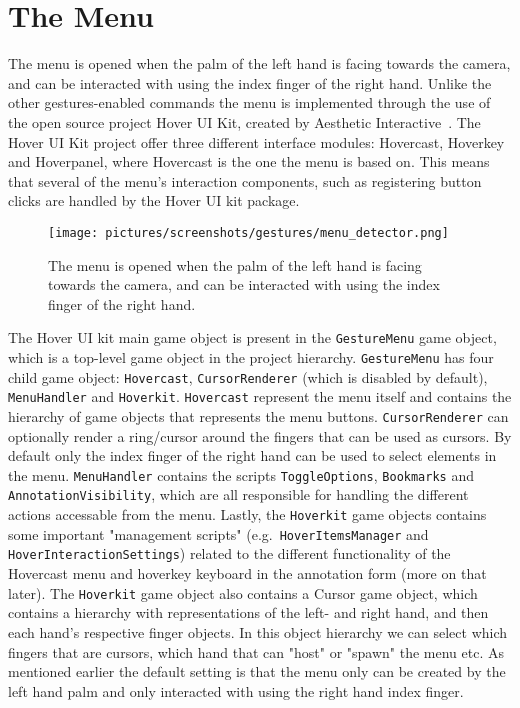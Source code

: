 \section{The Menu}
The menu is opened when the palm of the left hand is facing towards the camera, and can be interacted with using the index finger of the right hand.
Unlike the other gestures-enabled commands the menu is implemented through the use of the open source project Hover UI Kit, created by Aesthetic Interactive~\citep{Hoverkit}.
The Hover UI Kit project offer three different interface modules: Hovercast, Hoverkey and Hoverpanel, where Hovercast is the one the menu is based on.
This means that several of the menu's interaction components, such as registering button clicks are handled by the Hover UI kit package.

\begin{figure}%
	\texttt{[image: pictures/screenshots/gestures/menu\_detector.png]}
	\caption[The Menu]{The menu is opened when the palm of the left hand is facing towards the camera, and can be interacted with using the index finger of the right hand.}
	\label{fig:menu_detector}
\end{figure} 

The Hover UI kit main game object is present in the \texttt{GestureMenu} game object, which is a top-level game object in the project hierarchy.
\texttt{GestureMenu} has four child game object: \texttt{Hovercast}, \texttt{CursorRenderer} (which is disabled by default), \texttt{MenuHandler} and \texttt{Hoverkit}.
\texttt{Hovercast} represent the menu itself and contains the hierarchy of game objects that represents the menu buttons. 
\texttt{CursorRenderer} can optionally render a ring/cursor around the fingers that can be used as cursors.
By default only the index finger of the right hand can be used to select elements in the menu.
\texttt{MenuHandler} contains the scripts \texttt{ToggleOptions}, \texttt{Bookmarks} and \texttt{AnnotationVisibility}, which are all responsible for handling
the different actions accessable from the menu.
Lastly, the \texttt{Hoverkit} game objects contains some important "management scripts" (e.g.~\texttt{HoverItemsManager} and \texttt{HoverInteractionSettings}) related to the 
different functionality of the Hovercast menu and hoverkey keyboard in the annotation form (more on that later). The \texttt{Hoverkit} game object also
contains a Cursor game object, which contains a hierarchy with representations of the left- and right hand, and then each hand's respective finger objects. 
In this object hierarchy we can select which fingers that are cursors, which hand that can "host" or "spawn" the menu etc. As mentioned earlier
the default setting is that the menu only can be created by the left hand palm and only interacted with using the right hand index finger. 
 
